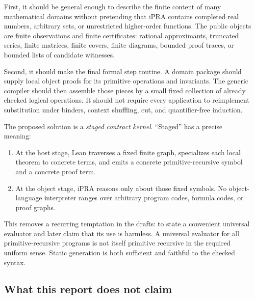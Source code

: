 First, it should be general enough to describe the finite content of many mathematical domains without
pretending that iPRA contains completed real numbers, arbitrary sets, or unrestricted higher-order
functions.  The public objects are finite observations and finite certificates: rational approximants,
truncated series, finite matrices, finite covers, finite diagrams, bounded proof traces, or bounded lists of
candidate witnesses.

Second, it should make the final formal step routine.  A domain package should supply local object proofs
for its primitive operations and invariants.  The generic compiler should then assemble those pieces by a
small fixed collection of already checked logical operations.  It should not require every application to
reimplement substitution under binders, context shuffling, cut, and quantifier-free induction.

The proposed solution is a \emph{staged contract kernel}.  ``Staged'' has a precise meaning:
\begin{enumerate}
  \item At the host stage, Lean traverses a fixed finite graph, specializes each local theorem to concrete
        terms, and emits a concrete primitive-recursive symbol and a concrete proof term.
  \item At the object stage, iPRA reasons only about those fixed symbols.  No object-language interpreter
        ranges over arbitrary program codes, formula codes, or proof graphs.
\end{enumerate}
This removes a recurring temptation in the drafts: to state a convenient universal evaluator and later
claim that its use is harmless.  A universal evaluator for all primitive-recursive programs is not itself
primitive recursive in the required uniform sense.  Static generation is both sufficient and faithful to
the checked syntax.

\subsection{What this report does not claim}

